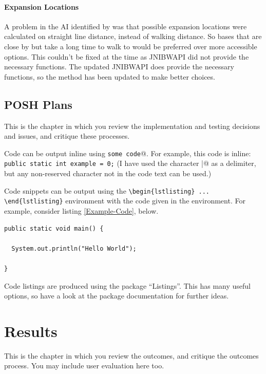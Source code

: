 \documentclass[11pt,openright,a4paper]{report}
\begin{document}
\subsubsection{Expansion Locations}
A problem in the AI identified by  was that possible expansion locations were calculated on straight line distance, instead of walking distance. So bases that are close by but take a long time to walk to would be preferred over more accessible options. This couldn't be fixed at the time as JNIBWAPI did not provide the necessary functions. The updated JNIBWAPI does provide the necessary functions, so the method has been updated to make better choices.

\section{POSH Plans}



This is the chapter in which you review the implementation and testing
decisions and issues, and critique these processes.

Code can be output inline using \verb@\lstinline|some code|@.  For example,
this code is inline: \lstinline|public static int example = 0;|  (I have
used the character \verb@|@ as a delimiter, but any non-reserved character
not in the code text can be used.)

Code snippets can be output using the \verb|\begin{lstlisting} ... \end{lstlisting}|
environment with the code given in the environment.  For
example, consider listing \ref{Example-Code}, below.

\begin{lstlisting}[breaklines,breakatwhitespace,caption={Example code},label=Example-Code]
public static void main() {

  System.out.println("Hello World");

}
\end{lstlisting}

Code listings are produced using the package ``Listings''.  This has many
useful options, so have a look at the package documentation for further
ideas.


\chapter{Results}
This is the chapter in which you review the outcomes, and
critique the outcomes process.  You may include user evaluation here
too.
\end{document}
